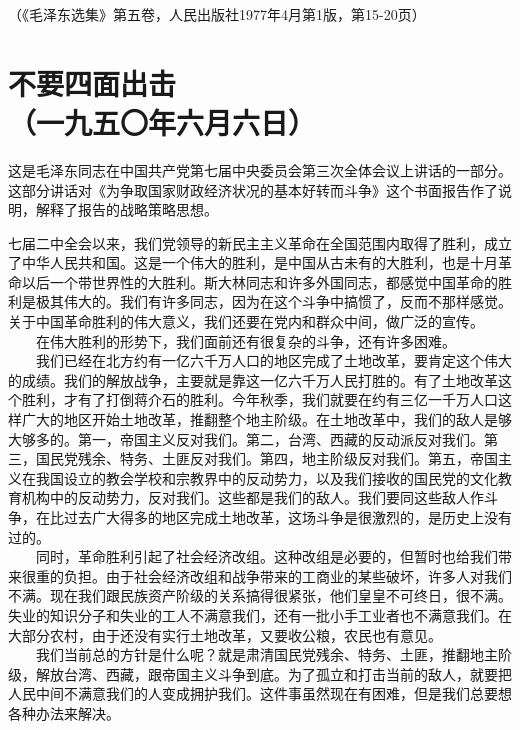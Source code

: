 \documentclass[cn,11pt,chinese]{elegantbook}
\def\myformat#1{\hfil\hfil #1}
\begin{document}
\begin{flushright}（《毛泽东选集》第五卷，人民出版社1977年4月第1版，第15-20页）\end{flushright}
\newpage\section*{\myformat{不要四面出击}\\\myformat{（一九五〇年六月六日）}}
\begin{introduction}\item  这是毛泽东同志在中国共产党第七届中央委员会第三次全体会议上讲话的一部分。这部分讲话对《为争取国家财政经济状况的基本好转而斗争》这个书面报告作了说明，解释了报告的战略策略思想。\end{introduction}
七届二中全会以来，我们党领导的新民主主义革命在全国范围内取得了胜利，成立了中华人民共和国。这是一个伟大的胜利，是中国从古未有的大胜利，也是十月革命以后一个带世界性的大胜利。斯大林同志和许多外国同志，都感觉中国革命的胜利是极其伟大的。我们有许多同志，因为在这个斗争中搞惯了，反而不那样感觉。关于中国革命胜利的伟大意义，我们还要在党内和群众中间，做广泛的宣传。\\
　　在伟大胜利的形势下，我们面前还有很复杂的斗争，还有许多困难。\\
　　我们已经在北方约有一亿六千万人口的地区完成了土地改革，要肯定这个伟大的成绩。我们的解放战争，主要就是靠这一亿六千万人民打胜的。有了土地改革这个胜利，才有了打倒蒋介石的胜利。今年秋季，我们就要在约有三亿一千万人口这样广大的地区开始土地改革，推翻整个地主阶级。在土地改革中，我们的敌人是够大够多的。第一，帝国主义反对我们。第二，台湾、西藏的反动派反对我们。第三，国民党残余、特务、土匪反对我们。第四，地主阶级反对我们。第五，帝国主义在我国设立的教会学校和宗教界中的反动势力，以及我们接收的国民党的文化教育机构中的反动势力，反对我们。这些都是我们的敌人。我们要同这些敌人作斗争，在比过去广大得多的地区完成土地改革，这场斗争是很激烈的，是历史上没有过的。\\
　　同时，革命胜利引起了社会经济改组。这种改组是必要的，但暂时也给我们带来很重的负担。由于社会经济改组和战争带来的工商业的某些破坏，许多人对我们不满。现在我们跟民族资产阶级的关系搞得很紧张，他们皇皇不可终日，很不满。失业的知识分子和失业的工人不满意我们，还有一批小手工业者也不满意我们。在大部分农村，由于还没有实行土地改革，又要收公粮，农民也有意见。\\
　　我们当前总的方针是什么呢？就是肃清国民党残余、特务、土匪，推翻地主阶级，解放台湾、西藏，跟帝国主义斗争到底。为了孤立和打击当前的敌人，就要把人民中间不满意我们的人变成拥护我们。这件事虽然现在有困难，但是我们总要想各种办法来解决。\\
\end{document}
